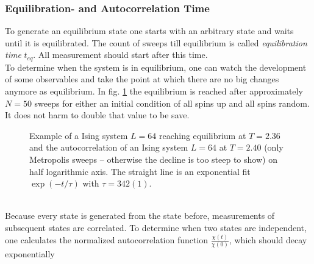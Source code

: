     \subsubsection{Equilibration- and Autocorrelation Time}
    \label{sssec:eqtime}
        To generate an equilibrium state one starts with an arbitrary state
        and waits until it is equilibrated. The count of sweeps till
        equilibrium is called \emph{equilibration time} \(t_{eq}\).
        All measurement should start after this time.\\
        To determine when the system is in equilibrium, one can watch the
        development of some observables and take the point at which there
        are no big changes anymore as equilibrium. In fig.
        \ref{fig:equiandauto}
        the equilibrium is reached after approximately \(N=50\) sweeps for
        either an initial condition of all spins up and all spins random. It
        does not harm to double that value to be save.
        \begin{figure}[htbp]
            \centering
            \caption[Examples for Equilibration and Autocorrelation]
            {
                 Example of a Ising system
                    \(L=64\) reaching equilibrium at \(T=2.36\) and
                 the autocorrelation of an
                    Ising system \(L=64\) at \(T=2.40\) (only Metropolis
                    sweeps -- otherwise the decline is too steep to show)
                    on half logarithmic axis.
                    The straight line is an exponential fit \(\exp(-t/\tau)\)
                    with \(\tau = 342(1)\).
            }
            \label{fig:equiandauto}
        \end{figure}\\
        Because every state is generated from the state before, measurements
        of subsequent states are correlated. To determine when two states
        are independent, one calculates the normalized autocorrelation function
        \(\frac{\chi(t)}{\chi(0)}\), which should decay exponentially
